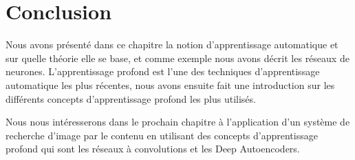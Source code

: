\section{Conclusion}

	Nous avons présenté dans ce chapitre la notion d'apprentissage automatique et sur quelle théorie elle se base, et comme exemple nous avons décrit les réseaux de neurones. L'apprentissage profond est l'une des techniques d'apprentissage automatique les plus récentes, nous avons ensuite fait une introduction sur les différents concepts d'apprentissage profond les plus utilisés.
	
	Nous nous intéresserons dans le prochain chapitre à l'application d'un système de recherche d'image par le contenu en utilisant des concepts d'apprentissage profond qui sont les réseaux à convolutions et les Deep Autoencoders.

